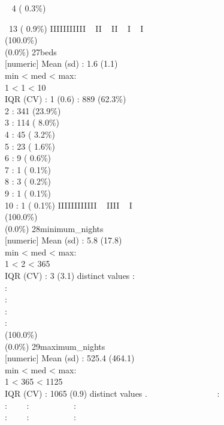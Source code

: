 \documentclass[
  journal,
]{IEEEtran}%
\begin{document}
\strut ~ 4 ( 0.3\%)\\
\strut ~13 ( 0.9\%) \textbar{} \textbar IIIIIIIIIII ~ II ~ II ~ I ~ I ~
~ ~ ~ ~ ~ \\
(100.0\%) \\
(0.0\%) \textbar{} \textbar{} 27\textbar beds\\
{[}numeric{]} \textbar Mean (sd) : 1.6 (1.1)\\
min \textless{} med \textless{} max:\\
1 \textless{} 1 \textless{} 10\\
IQR (CV) : 1 (0.6)  : 889 (62.3\%)\\
2 : 341 (23.9\%)\\
3 : 114 ( 8.0\%)\\
4 : 45 ( 3.2\%)\\
5 : 23 ( 1.6\%)\\
6 : 9 ( 0.6\%)\\
7 : 1 ( 0.1\%)\\
8 : 3 ( 0.2\%)\\
9 : 1 ( 0.1\%)\\
10 : 1 ( 0.1\%) \textbar{} \textbar IIIIIIIIIIII ~ IIII ~ I ~ ~ ~ ~ ~ ~
~ \\
(100.0\%) \\
(0.0\%) \textbar{} \textbar{} 28\textbar minimum\_nights\\
{[}numeric{]} \textbar Mean (sd) : 5.8 (17.8)\\
min \textless{} med \textless{} max:\\
1 \textless{} 2 \textless{} 365\\
IQR (CV) : 3 (3.1)  distinct values \textbar{} \textbar:\\
:\\
:\\
:\\
: \\
(100.0\%) \\
(0.0\%) \textbar{} \textbar{} 29\textbar maximum\_nights\\
{[}numeric{]} \textbar Mean (sd) : 525.4 (464.1)\\
min \textless{} med \textless{} max:\\
1 \textless{} 365 \textless{} 1125\\
IQR (CV) : 1065 (0.9)  distinct values \textbar{} \textbar.
~~~~~~~~~~~~~~~~:\\
: ~~~~: ~~~~~~~~~~:\\
: ~~~~: ~~~~~~~~~~:\\
\end{document}
